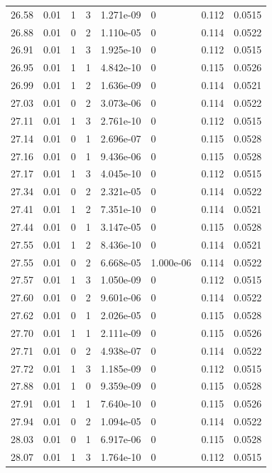 \documentclass[preview]{standalone}
\begin{document}
{{{{{{{{{{{\begin{tabular}{L{1.2cm}C{1.2cm} C{0.3cm}C{0.5cm} C{1.4cm}C{1.4cm} C{1.4cm}C{1.4cm}}
  26.58  &  0.01  & 1     &  3 &  1.271e-09  & 0  & 0.112 &  0.0515   \\ 
  26.88  &  0.01  & 0     &  2 &  1.110e-05  & 0  & 0.114 &  0.0522   \\ 
  26.91  &  0.01  & 1     &  3 &  1.925e-10  & 0  & 0.112 &  0.0515   \\ 
  26.95  &  0.01  & 1     &  1 &  4.842e-10  & 0  & 0.115 &  0.0526   \\ 
  26.99  &  0.01  & 1     &  2 &  1.636e-09  & 0  & 0.114 &  0.0521   \\ 
  27.03  &  0.01  & 0     &  2 &  3.073e-06  & 0  & 0.114 &  0.0522   \\ 
  27.11  &  0.01  & 1     &  3 &  2.761e-10  & 0  & 0.112 &  0.0515   \\ 
  27.14  &  0.01  & 0     &  1 &  2.696e-07  & 0  & 0.115 &  0.0528   \\ 
  27.16  &  0.01  & 0     &  1 &  9.436e-06  & 0  & 0.115 &  0.0528   \\ 
  27.17  &  0.01  & 1     &  3 &  4.045e-10  & 0  & 0.112 &  0.0515   \\ 
  27.34  &  0.01  & 0     &  2 &  2.321e-05  & 0  & 0.114 &  0.0522   \\ 
  27.41  &  0.01  & 1     &  2 &  7.351e-10  & 0  & 0.114 &  0.0521   \\ 
  27.44  &  0.01  & 0     &  1 &  3.147e-05  & 0  & 0.115 &  0.0528   \\ 
  27.55  &  0.01  & 1     &  2 &  8.436e-10  & 0  & 0.114 &  0.0521   \\ 
  27.55  &  0.01  & 0     &  2 &  6.668e-05  & 1.000e-06  & 0.114 &  0.0522   \\ 
  27.57  &  0.01  & 1     &  3 &  1.050e-09  & 0  & 0.112 &  0.0515   \\ 
  27.60  &  0.01  & 0     &  2 &  9.601e-06  & 0  & 0.114 &  0.0522   \\ 
  27.62  &  0.01  & 0     &  1 &  2.026e-05  & 0  & 0.115 &  0.0528   \\ 
  27.70  &  0.01  & 1     &  1 &  2.111e-09  & 0  & 0.115 &  0.0526   \\ 
  27.71  &  0.01  & 0     &  2 &  4.938e-07  & 0  & 0.114 &  0.0522   \\ 
  27.72  &  0.01  & 1     &  3 &  1.185e-09  & 0  & 0.112 &  0.0515   \\ 
  27.88  &  0.01  & 1     &  0 &  9.359e-09  & 0  & 0.115 &  0.0528   \\ 
  27.91  &  0.01  & 1     &  1 &  7.640e-10  & 0  & 0.115 &  0.0526   \\ 
  27.94  &  0.01  & 0     &  2 &  1.094e-05  & 0  & 0.114 &  0.0522   \\ 
  28.03  &  0.01  & 0     &  1 &  6.917e-06  & 0  & 0.115 &  0.0528   \\ 
  28.07  &  0.01  & 1     &  3 &  1.764e-10  & 0  & 0.112 &  0.0515   \\ 
\hline 
\end{tabular} 

}}}}}}}}}}}
\end{document}
